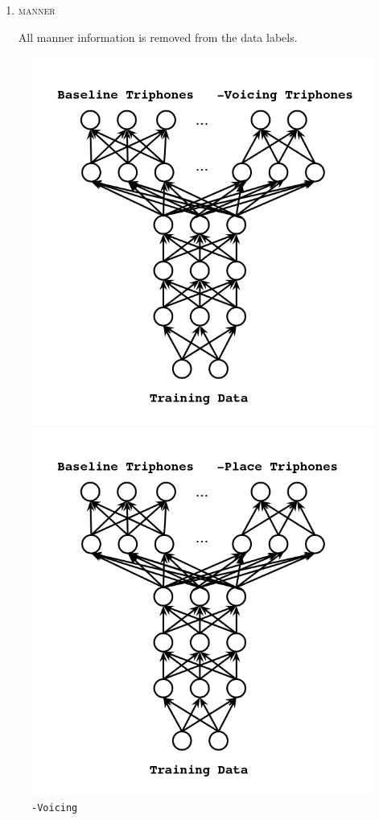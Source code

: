 \documentclass[10pt,a4paper]{article}
\begin{document}
\begin{enumerate}
\begin{enumerate}
  \item \textsc{manner}
    
    All manner information is removed from the data labels.
    
  \end{enumerate}


\begin{figure}[!htb]
  \includegraphics[width=\linewidth]{figs/mtl-arch-voicing.png}
  \caption{\texttt{-Voicing}}
\endminipage\hfill
{}
  \includegraphics[width=\linewidth]{figs/mtl-arch-place.png}

\end{figure}
\end{enumerate}
\end{document}
